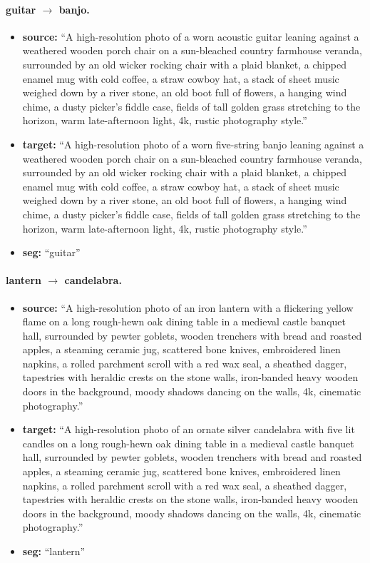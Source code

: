 \paragraph{guitar $\to$ banjo.}
\begin{itemize}
    \item \textbf{source:} ``A high-resolution photo of a worn acoustic guitar leaning against a weathered wooden porch chair on a sun-bleached country farmhouse veranda, surrounded by an old wicker rocking chair with a plaid blanket, a chipped enamel mug with cold coffee, a straw cowboy hat, a stack of sheet music weighed down by a river stone, an old boot full of flowers, a hanging wind chime, a dusty picker's fiddle case, fields of tall golden grass stretching to the horizon, warm late-afternoon light, 4k, rustic photography style.''
    \item \textbf{target:} ``A high-resolution photo of a worn five-string banjo leaning against a weathered wooden porch chair on a sun-bleached country farmhouse veranda, surrounded by an old wicker rocking chair with a plaid blanket, a chipped enamel mug with cold coffee, a straw cowboy hat, a stack of sheet music weighed down by a river stone, an old boot full of flowers, a hanging wind chime, a dusty picker's fiddle case, fields of tall golden grass stretching to the horizon, warm late-afternoon light, 4k, rustic photography style.''
    \item \textbf{seg:} ``guitar''
\end{itemize}

\paragraph{lantern $\to$ candelabra.}
\begin{itemize}
    \item \textbf{source:} ``A high-resolution photo of an iron lantern with a flickering yellow flame on a long rough-hewn oak dining table in a medieval castle banquet hall, surrounded by pewter goblets, wooden trenchers with bread and roasted apples, a steaming ceramic jug, scattered bone knives, embroidered linen napkins, a rolled parchment scroll with a red wax seal, a sheathed dagger, tapestries with heraldic crests on the stone walls, iron-banded heavy wooden doors in the background, moody shadows dancing on the walls, 4k, cinematic photography.''
    \item \textbf{target:} ``A high-resolution photo of an ornate silver candelabra with five lit candles on a long rough-hewn oak dining table in a medieval castle banquet hall, surrounded by pewter goblets, wooden trenchers with bread and roasted apples, a steaming ceramic jug, scattered bone knives, embroidered linen napkins, a rolled parchment scroll with a red wax seal, a sheathed dagger, tapestries with heraldic crests on the stone walls, iron-banded heavy wooden doors in the background, moody shadows dancing on the walls, 4k, cinematic photography.''
    \item \textbf{seg:} ``lantern''
\end{itemize}

